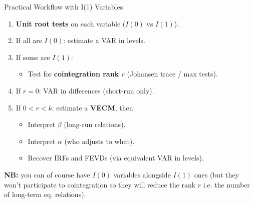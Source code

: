 \documentclass{beamer}
\begin{document}
\begin{frame}{Practical Workflow with I(1) Variables}
\small
\begin{enumerate}
  \item \textbf{Unit root tests} on each variable ($I(0)$ vs $I(1)$).
  \item If all are $I(0)$: estimate a VAR in levels.
  \item If some are $I(1)$:
    \begin{itemize}
      \item Test for \textbf{cointegration rank $r$} (Johansen trace / max tests).
    \end{itemize}
  \item If $r = 0$: VAR in differences (short-run only).
  \item If $0 < r < k$: estimate a \textbf{VECM}, then:
    \begin{itemize}
      \item Interpret $\beta$ (long-run relations).
      \item Interpret $\alpha$ (who adjusts to what).
      \item Recover IRFs and FEVDs (via equivalent VAR in levels).
    \end{itemize}
\end{enumerate}

\textbf{NB:} you can of course have $I(0)$ variables alongside $I(1)$ ones (but they won't participate to cointegration so they will reduce the rank $r$ i.e. the number of long-term eq. relations). 

\end{frame}
\end{document}
